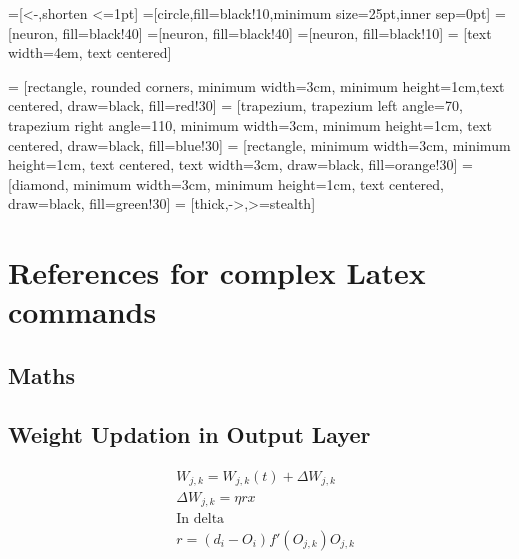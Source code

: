 \documentclass[12pt, right open]{memoir}
\begin{document}



=[<-,shorten <=1pt]
=[circle,fill=black!10,minimum size=25pt,inner sep=0pt]
=[neuron, fill=black!40]
=[neuron, fill=black!40]
=[neuron, fill=black!10]
 = [text width=4em, text centered]

 = [rectangle, rounded corners, minimum width=3cm, minimum height=1cm,text centered, draw=black, fill=red!30]
 = [trapezium, trapezium left angle=70, trapezium right angle=110, minimum width=3cm, minimum height=1cm, text centered, draw=black, fill=blue!30]
 = [rectangle, minimum width=3cm, minimum height=1cm, text centered, text width=3cm, draw=black, fill=orange!30]
 = [diamond, minimum width=3cm, minimum height=1cm, text centered, draw=black, fill=green!30]
 = [thick,->,>=stealth]

\tableofcontents

\chapter{References for complex Latex commands}

\section{Maths}
\section{Weight Updation in Output Layer}
\begin{align*}
&W_{j,k} = W_{j,k}(t) + \Delta W_{j,k} \\
&\Delta W_{j,k} = \eta r x \\
&\text{In delta} \\
&r = (d_i - O_i) f' (O_{j,k})O_{j,k}
\end{align*}
\end{document}
